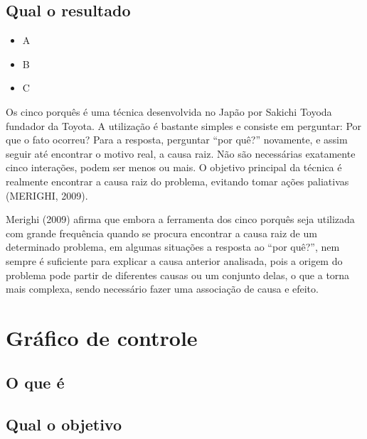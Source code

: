 \documentclass[
]{article}
\providecommand{\tightlist}{%
  \setlength{\itemsep}{0pt}\setlength{\parskip}{0pt}}
\begin{document}
\hypertarget{qual-o-resultado-5}{%
\subsection*{Qual o resultado}\label{qual-o-resultado-5}}

\begin{itemize}
\tightlist
\item
  A
\item
  B
\item
  C
\end{itemize}

Os cinco porquês é uma técnica desenvolvida no Japão por Sakichi Toyoda fundador da Toyota. A utilização é bastante simples e consiste em perguntar: Por que o fato ocorreu? Para a resposta, perguntar ``por quê?'' novamente, e assim seguir até encontrar o motivo real, a causa raiz. Não são necessárias exatamente cinco interações, podem ser menos ou mais. O objetivo principal da técnica é realmente encontrar a causa raiz do problema, evitando tomar ações paliativas (MERIGHI, 2009).

Merighi (2009) afirma que embora a ferramenta dos cinco porquês seja utilizada com grande frequência quando se procura encontrar a causa raiz de um determinado problema, em algumas situações a resposta ao ``por quê?'', nem sempre é suficiente para explicar a causa anterior analisada, pois a origem do problema pode partir de diferentes causas ou um conjunto delas, o que a torna mais complexa, sendo necessário fazer uma associação de causa e efeito.

\hypertarget{gruxe1fico-de-controle}{%
\section{Gráfico de controle}\label{gruxe1fico-de-controle}}

\hypertarget{o-que-uxe9-6}{%
\subsection*{O que é}\label{o-que-uxe9-6}}

\hypertarget{qual-o-objetivo-6}{%
\subsection*{Qual o objetivo}\label{qual-o-objetivo-6}}
\end{document}
